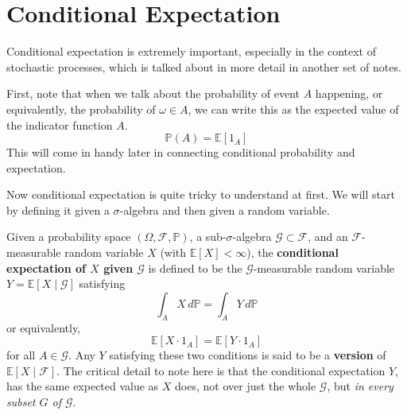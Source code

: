 \section{Conditional Expectation}

  Conditional expectation is extremely important, especially in the context of stochastic processes, which is talked about in more detail in another set of notes. 

  First, note that when we talk about the probability of event $A$ happening, or equivalently, the probability of $\omega \in A$, we can write this as the expected value of the indicator function $A$. 
  \begin{equation}
    \mathbb{P}(A) = \mathbb{E}[1_A]
  \end{equation}
  This will come in handy later in connecting conditional probability and expectation. 

  Now conditional expectation is quite tricky to understand at first. We will start by defining it given a $\sigma$-algebra and then given a random variable. 

  \begin{definition}
    Given a probability space $(\Omega, \mathcal{F}, \mathbb{P})$, a sub-$\sigma$-algebra $\mathcal{G} \subset \mathcal{F}$, and an $\mathcal{F}$-measurable random variable $X$ (with $\mathbb{E}[X] < \infty$), the \textbf{conditional expectation of $X$ given $\mathcal{G}$} is defined to be the $\mathcal{G}$-measurable random variable $Y = \mathbb{E}[X \mid \mathcal{G}]$ satisfying 
    \begin{equation}
      \int_A X \,d\mathbb{P} = \int_A Y \,d \mathbb{P}
    \end{equation}
    or equivalently, 
    \begin{equation}
      \mathbb{E}[X \cdot 1_A] = \mathbb{E}[Y \cdot 1_A]
    \end{equation}
    for all $A \in \mathcal{G}$. Any $Y$ satisfying these two conditions is said to be a \textbf{version} of $\mathbb{E}[X \mid \mathcal{F}]$. The critical detail to note here is that the conditional expectation $Y$, has the same expected value as $X$ does, not over just the whole $\mathcal{G}$, but \textit{in every subset $G$ of $\mathcal{G}$}. 
  \end{definition}

